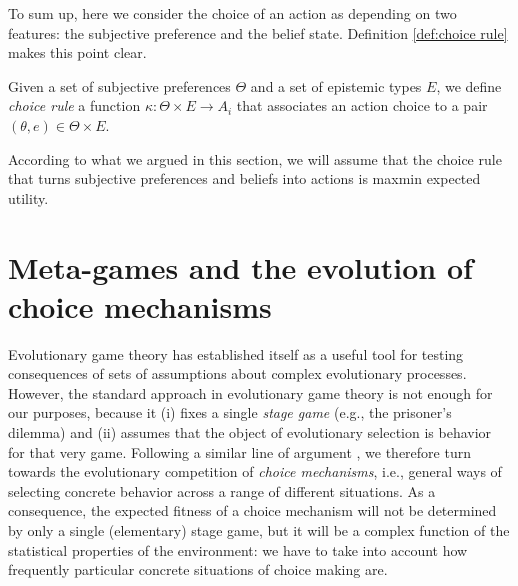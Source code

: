 \documentclass[fleqn,reqno,11pt]{article}
\begin{document}
To sum up, here we consider the choice of an action as depending on two features: the subjective preference and the belief state. Definition \ref{def:choice rule} makes this point clear.

\begin{definition} \label{def:choice rule}

Given a set of subjective preferences $\Theta$ and a set of epistemic types $E$, we define \textit{choice rule} a function $\kappa: \Theta \times E  \rightarrow A_i$ that associates an action choice to a pair $(\theta, e) \in \Theta \times E$.

\end{definition}

According to what we argued in this section, we will assume that the choice rule that turns subjective preferences and beliefs into actions is maxmin expected utility.





\iffalse

\begin{fact} \label{fact:maxEU-minReg}

For any probability measure $\mu$, maximization of expected utility and minimization of expected regret are behaviorally equivalent.

\end{fact}

\noindent As we have seen in the previous example, this is not the case in the presence of (radical) uncertainty, in the sense of representation of belief state in terms of a set of probability, as in $ \Delta(A_{-i}) $.
\fi








\newpage

\section{Meta-games and the evolution of choice mechanisms}
\label{sec:model}

Evolutionary game theory has established itself as a useful tool for testing consequences of
sets of assumptions about complex evolutionary processes. However, the standard approach in
evolutionary game theory is not enough for our purposes, because it (i) fixes a single
\emph{stage game} (e.g., the prisoner's dilemma) and (ii) assumes that the object of
evolutionary selection is behavior for that very game. Following a similar line of argument
\citep[e.g.][]{FawcettHamblin2013:Exposing-the-be}, we therefore turn towards the evolutionary
competition of \emph{choice mechanisms}, i.e., general ways of selecting concrete behavior
across a range of different situations. As a consequence, the expected fitness of a choice
mechanism will not be determined by only a single (elementary) stage game, but it will be a
complex function of the statistical properties of the environment: we have to take into account
how frequently particular concrete situations of choice making are.
\end{document}
